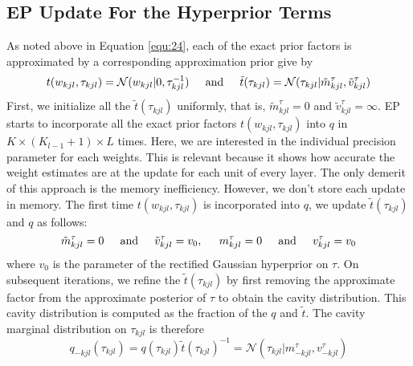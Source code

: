 \documentclass[]{article}
\begin{document}
\subsection{EP Update For the Hyperprior Terms}
As noted above in Equation \ref{equ:24}, each of the exact prior factors is approximated by a corresponding approximation prior give by 
\begin{equation}
	t(w_{kjl},\tau_{kjl}) = \mathcal{N}(w_{kjl}|0,\tau^{-1}_{kjl}) \hspace{0.2in} \text{and} \hspace{0.2in} \tilde{t}(\tau_{kjl}) = \mathcal{N}(\tau_{kjl}|\tilde{m}_{kjl}^{\tau},\tilde{v}_{kjl}^{\tau})
	\label{equ:33}
\end{equation}
First, we initialize all the $\tilde{t}(\tau_{kjl})$ uniformly, that is, $\tilde{m}^{\tau}_{kjl} = 0$ and $\tilde{v}^{\tau}_{kjl} = \infty$. EP starts to incorporate all the exact prior factors $t(w_{kjl},\tau_{kjl})$ into $q$ in $K \times (K_{l-1} + 1) \times L$ times. Here, we are interested in the individual precision parameter for each weights. This is relevant because it shows how accurate the weight estimates are at the update for each unit of every layer. The only demerit of this approach is the memory inefficiency. However, we don't store each update in memory. The first time $t(w_{kjl},\tau_{kjl})$ is incorporated into $q$, we update $\tilde{t}(\tau_{kjl})$ and $q$ as follows:
\begin{equation}
	\tilde{m}^\tau_{kjl} = 0 \hspace*{0.2in} \text{and} \hspace*{0.2in} \tilde{v}^\tau_{kjl} = v_0, \hspace*{0.2in}
	m^\tau_{kjl} = 0 \hspace*{0.2in} \text{and} \hspace*{0.2in} v^\tau_{kjl} = v_0
	\label{equ:34}
\end{equation}
where $v_0$ is the parameter of the rectified Gaussian hyperprior on $\tau$. On subsequent iterations, we refine the $\tilde{t}(\tau_{kjl})$ by first removing the approximate factor from the approximate posterior of $\tau$ to obtain the cavity distribution. This cavity distribution is computed as the fraction of the $q$ and $\tilde{t}$. The cavity marginal distribution on $\tau_{kjl}$ is therefore
\begin{equation}
	q_{-kjl}(\tau_{kjl}) = q(\tau_{kjl})\tilde{t}(\tau_{kjl})^{-1} = \mathcal{N}(\tau_{kjl}|m^\tau_{-kjl},v^\tau_{-kjl})
	\label{equ:35}
\end{equation}
\end{document}
